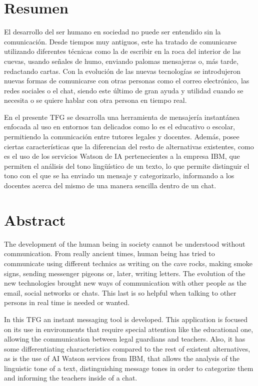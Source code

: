 \chapter{Resumen}
El desarrollo del ser humano en sociedad no puede ser entendido sin la comunicación. Desde tiempos muy antiguos, este ha tratado de comunicarse utilizando diferentes técnicas como la de escribir en la roca del interior de las cuevas, usando señales de humo, enviando palomas mensajeras o, más tarde, redactando cartas. Con la evolución de las nuevas tecnologías se introdujeron nuevas formas de comunicarse con otras personas como el correo electrónico, las redes sociales o el chat, siendo este último de gran ayuda y utilidad cuando se necesita o se quiere hablar con otra persona en tiempo real.

En el presente \acf{TFG} se desarrolla una herramienta de mensajería instantánea enfocada al uso en entornos tan delicados como lo es el educativo o escolar, permitiendo la comunicación entre tutores legales y docentes. Además, posee ciertas características que la diferencian del resto de alternativas existentes, como es el uso de los servicios Watson de \acf{IA} pertenecientes a la empresa IBM, que permiten el análisis del tono lingüístico de un texto, lo que permite distinguir el tono con el que se ha enviado un mensaje y categorizarlo, informando a los docentes acerca del mismo de una manera sencilla dentro de un chat.


\chapter{Abstract}

The development of the human being in society cannot be understood without \linebreak communication. From really ancient times, human being has tried to communicate using different technics as writing on the cave rocks, making smoke signs, sending messenger pigeons or, later, writing letters. The evolution of the new technologies brought new ways of communication with other people as the email, social networks or chats. This last is so helpful when talking to other persons in real time is needed or wanted.

In this \acs{TFG} an instant messaging tool is developed. This application is focused on its use in environments that require special attention like the educational one, allowing the \mbox{communication} between legal guardians and teachers. Also, it has some differentiating \linebreak characteristics compared to the rest of existent alternatives, as is the use of AI Watson \mbox{services} from IBM, that allows the analysis of the linguistic tone of a text, distinguishing message tones in order to categorize them and informing the teachers inside of a chat.
